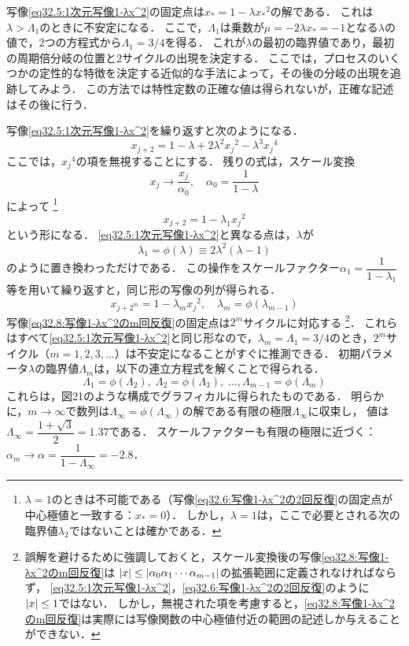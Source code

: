写像\eqref{eq32.5:1次元写像1-λx^2}の固定点は$x_*=1-\lambda {x_*}^2$の解である．
これは$\lambda>\Lambda_1$のときに不安定になる．
ここで，$\Lambda_1$は乗数が$\mu=-2\lambda x_*=-1$となる$\lambda$の値で，2つの方程式から$\Lambda_1=3/4$を得る．
これが$\lambda$の最初の臨界値であり，最初の周期倍分岐の位置と2サイクルの出現を決定する．
ここでは，プロセスのいくつかの定性的な特徴を決定する近似的な手法によって，その後の分岐の出現を追跡してみよう．
この方法では特性定数の正確な値は得られないが，正確な記述はその後に行う．




写像\eqref{eq32.5:1次元写像1-λx^2}を繰り返すと次のようになる．
\begin{equation}\label{eq32.6:写像1-λx^2の2回反復}
    x_{j+2} = 1 -\lambda +2\lambda^2{x_j}^2 -\lambda^3{x_j}^4
\end{equation}
ここでは，${x_j}^4$の項を無視することにする．
残りの式は，スケール変換
\[
    x_j \to \frac{x_j}{\alpha_0}, \quad \alpha_0 = \frac{1}{1-\lambda}
\]
によって
\footnote{$\lambda=1$のときは不可能である（写像\eqref{eq32.6:写像1-λx^2の2回反復}の固定点が中心極値と一致する：$x_*=0$）．
しかし，$\lambda=1$は，ここで必要とされる次の臨界値$\lambda_2$ではないことは確かである．}
\[
    x_{j+2} = 1-\lambda_1 {x_j}^2
\]
という形になる．
\eqref{eq32.5:1次元写像1-λx^2}と異なる点は，$\lambda$が
\begin{equation}\label{eq32.7:λ1の定義}
    \lambda_1 = \phi(\lambda) \equiv 2\lambda^2(\lambda-1)
\end{equation}
のように置き換わっただけである．
この操作をスケールファクター$\alpha_1=\dfrac{1}{1-\lambda_1}$等を用いて繰り返すと，同じ形の写像の列が得られる．
\begin{equation}\label{eq32.8:写像1-λx^2のm回反復}
    x_{j+2^m} = 1-\lambda_m {x_j}^2, \quad \lambda_m = \phi(\lambda_{m-1})
\end{equation}
写像\eqref{eq32.8:写像1-λx^2のm回反復}の固定点は$2^m$サイクルに対応する
\footnote{誤解を避けるために強調しておくと，スケール変換後の写像\eqref{eq32.8:写像1-λx^2のm回反復}は
$\abs{x} \leq \abs{ \alpha_0 \alpha_1 \cdots \alpha_{m-1} }$の拡張範囲に定義されなければならず，
\eqref{eq32.5:1次元写像1-λx^2}，\eqref{eq32.6:写像1-λx^2の2回反復}のように$\abs{x}\leq 1$ではない．
しかし，無視された項を考慮すると，\eqref{eq32.8:写像1-λx^2のm回反復}は実際には写像関数の中心極値付近の範囲の記述しか与えることができない．}．
これらはすべて\eqref{eq32.5:1次元写像1-λx^2}と同じ形なので，$\lambda_m=\Lambda_1=3/4$のとき，$2^m$サイクル（$m=1,2,3, \ldots$）は不安定になることがすぐに推測できる．
初期パラメータ$\lambda$の臨界値$\Lambda_m$は，以下の連立方程式を解くことで得られる．
\[
    \Lambda_1 = \phi(\Lambda_2), \;
    \Lambda_2 = \phi(\Lambda_3), \; \ldots ,
    \Lambda_{m-1} = \phi(\Lambda_m)
\]
これらは，図21のような構成でグラフィカルに得られたものである．
明らかに，$m\to\infty$で数列は$\Lambda_\infty=\phi(\Lambda_\infty)$の解である有限の極限$\Lambda_\infty$に収束し，
値は$\Lambda_\infty=\dfrac{1+\sqrt{3}}{2} = 1.37$である．
スケールファクターも有限の極限に近づく：$\alpha_m \to \alpha=\dfrac{1}{1-\Lambda_\infty} = -2.8$．




